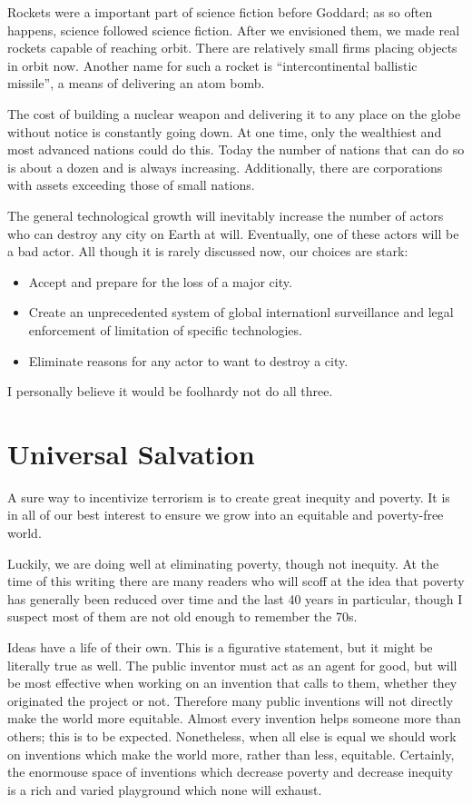\documentclass[
	fontsize=10pt, %
	twoside=false, %
	secnumdepth=1, %
]{kaobook}
\begin{document}
Rockets were a important part of science fiction before Goddard;
as so often happens, science followed science fiction.
After we envisioned them, we made real rockets capable of reaching orbit.
There are relatively small firms
placing objects in orbit now.
Another name for such a
rocket is ``intercontinental ballistic missile'', a means
of delivering an atom bomb.

The cost of building a nuclear weapon and delivering it
to any place on the globe without notice is constantly
going down. At one time, only the wealthiest and most
advanced nations could do this. Today the number of
nations that can do so is about a dozen and is always
increasing. Additionally, there are corporations with
assets exceeding those of small nations.

The general technological growth will inevitably
increase the number of actors who can destroy any city
on Earth at will.
Eventually, one of these actors will be a bad actor.
All though it is rarely discussed now, our choices are
stark:
\begin{itemize}
\item Accept and prepare for the loss of a major city.
\item Create an unprecedented system of global internationl
  surveillance and legal enforcement of limitation of
  specific technologies.
\item Eliminate reasons for any actor to want to destroy
  a city.
\end{itemize}
I personally believe it would be foolhardy not do
all three.

\chapter{Universal Salvation}

A sure way to incentivize terrorism is to create
great inequity and poverty.
It is in all of our best interest to ensure
we grow into an equitable and poverty-free world.

Luckily, we are doing well at eliminating poverty,
though not inequity.
At the time of this
writing there are many readers who will scoff at the
idea that poverty has generally been reduced over time
and the last 40 years in particular\cite{Pinker2019}, though I suspect most
of them are not old enough to remember the 70s.

Ideas have a life of their own.
This is a figurative statement, but it might be literally
true as well.
The public inventor must act as an agent for good, but
will be most effective when working on an invention that calls to them,
whether they originated the project or not.
Therefore many public inventions will not directly make the world more equitable.
Almost every invention helps someone more than others; this is to be
expected.
Nonetheless, when all else is equal we should work on inventions which
make the world more, rather than less, equitable.
Certainly, the enormouse space of inventions which decrease poverty
and decrease inequity is a rich and varied playground which
none will exhaust.
\end{document}
